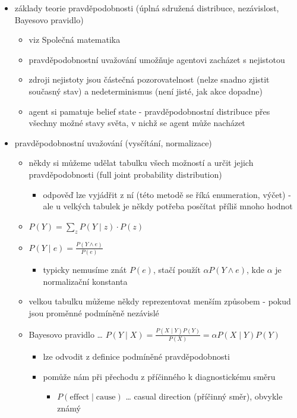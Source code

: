 \begin{itemize}
\item základy teorie pravděpodobnosti (úplná sdružená distribuce, nezávislost, Bayesovo pravidlo)
\begin{itemize}
\item viz Společná matematika
\item pravděpodobnostní uvažování umožňuje agentovi zacházet s nejistotou
\item zdroji nejistoty jsou částečná pozorovatelnost (nelze snadno zjistit současný stav) a nedeterminismus (není jisté, jak akce dopadne)
\item agent si pamatuje belief state - pravděpodobnostní distribuce přes všechny možné stavy světa, v nichž se agent může nacházet
\end{itemize}
\item pravděpodobnostní uvažování (vysčítání, normalizace)
\begin{itemize}
\item někdy si můžeme udělat tabulku všech možností a určit jejich pravděpodobnosti (full joint probability distribution)
\begin{itemize}
\item odpověď lze vyjádřit z ní (této metodě se říká enumeration, výčet) - ale u velkých tabulek je někdy potřeba posčítat příliš mnoho hodnot
\end{itemize}
\item $P(Y)=\sum_z P(Y\mid z)\cdot P(z)$
\item $P(Y\mid e)=\frac{P(Y\land e)}{P(e)}$
\begin{itemize}
\item typicky nemusíme znát $P(e)$, stačí použít $\alpha P(Y\land e)$, kde $\alpha$ je normalizační konstanta
\end{itemize}
\item velkou tabulku můžeme někdy reprezentovat menším způsobem - pokud jsou proměnné podmíněně nezávislé
\item Bayesovo pravidlo \dots{} $P(Y\mid X)=\frac{P(X\mid Y)P(Y)}{P(X)}=\alpha P(X\mid Y) P(Y)$
\begin{itemize}
\item lze odvodit z definice podmíněné pravděpodobnosti
\item pomůže nám při přechodu z příčinného k diagnostickému směru
\begin{itemize}
\item $P(\mathrm{effect} \mid \mathrm{cause})$ \dots{} casual direction (příčinný směr), obvykle známý

\end{itemize}
\end{itemize}
\end{itemize}
\end{itemize}
